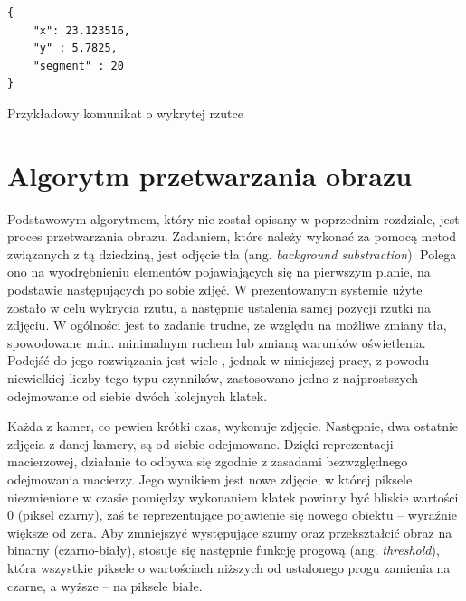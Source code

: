 \begin{listing}[h!]
\begin{verbatim}
{     
    "x": 23.123516,
    "y" : 5.7825,
    "segment" : 20
}
\end{verbatim}
\caption{Przykładowy komunikat o wykrytej rzutce} 
\label{json}
\end{listing}

\section{Algorytm przetwarzania obrazu}
Podstawowym algorytmem, który nie został opisany w poprzednim rozdziale, jest proces przetwarzania obrazu. Zadaniem, które należy wykonać za pomocą metod związanych z tą dziedziną, jest odjęcie tła (ang. \textit{background substraction}). Polega ono na wyodrębnieniu elementów pojawiających się na pierwszym planie, na podstawie następujących po sobie zdjęć. W prezentowanym systemie użyte zostało w celu wykrycia rzutu, a następnie ustalenia samej pozycji rzutki na zdjęciu. W ogólności jest to zadanie trudne, ze względu na możliwe zmiany tła, spowodowane m.in. minimalnym ruchem lub zmianą warunków oświetlenia. Podejść do jego rozwiązania jest wiele \cite{LearningOpenCV}, jednak w niniejszej pracy, z powodu niewielkiej liczby tego typu czynników, zastosowano jedno z najprostszych - odejmowanie od siebie dwóch kolejnych klatek.

Każda z kamer, co pewien krótki czas, wykonuje zdjęcie. Następnie, dwa ostatnie zdjęcia z danej kamery, są od siebie odejmowane. Dzięki reprezentacji macierzowej, działanie to odbywa się zgodnie z zasadami bezwzględnego odejmowania macierzy. Jego wynikiem jest nowe zdjęcie, w której piksele niezmienione w czasie pomiędzy wykonaniem klatek powinny być bliskie wartości 0 (piksel czarny), zaś te reprezentujące pojawienie się nowego obiektu -- wyraźnie większe od zera. Aby zmniejszyć występujące szumy oraz przekształcić obraz na binarny (czarno-biały), stosuje się następnie funkcję progową (ang. \textit{threshold}), która wszystkie piksele o wartościach niższych od ustalonego progu zamienia na czarne, a wyższe -- na piksele białe. 

